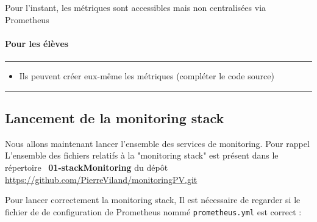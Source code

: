 \documentclass[french, 12pt]{article}%
\newcommand{\itemE}{\item[$\bullet$]}
\newif\ifPROF
\begin{document}
Pour l'instant, les métriques sont accessibles mais non centralisées via Prometheus




\paragraph{Pour les élèves}
\begin{center}
 \rule{0.75\linewidth}{1pt}
 \end{center}
 \begin{itemize}
 \itemE Ils peuvent créer eux-même les métriques (compléter le code source)
 \end{itemize}
\begin{center}
 \rule{0.75\linewidth}{1pt}
 \end{center}



\ifPROF
\color{red}
\begin{lstlisting}[style=commande]  
 HELP http_post_nb_requete_total Nombre total de requete POST
# TYPE http_post_nb_requete_total counter
http_post_nb_requete_total 47.0
# HELP http_post_nb_requete_created Nombre total de requete POST
# TYPE http_post_nb_requete_created gauge
http_post_nb_requete_created 1.7358412745360215e+09
# HELP http_temps_reponse Histogramme des temps de reponse HTTP (s)
# TYPE http_temps_reponse histogram
http_temps_reponse_bucket{le="0.001"} 22.0
http_temps_reponse_bucket{le="0.0015"} 23.0
http_temps_reponse_bucket{le="0.002"} 44.0
http_temps_reponse_bucket{le="0.003"} 47.0
http_temps_reponse_bucket{le="0.005"} 47.0
http_temps_reponse_bucket{le="0.0075"} 47.0
http_temps_reponse_bucket{le="+Inf"} 47.0
http_temps_reponse_count 47.0
\end{lstlisting}

\normalcolor
\fi




\subsection{Lancement de la monitoring stack}

Nous allons maintenant lancer l'ensemble des services de monitoring. Pour rappel L'ensemble des fichiers relatifs à la "monitoring stack" est présent dans le répertoire \ \textbf{01-stackMonitoring} du dépôt  \href{https://github.com/PierreViland/monitoringPV.git}{https://github.com/PierreViland/monitoringPV.git}

Pour lancer correctement la monitoring stack, Il est nécessaire de regarder si le fichier de de configuration de Prometheus nommé \verb?prometheus.yml? est correct :
\end{document}
